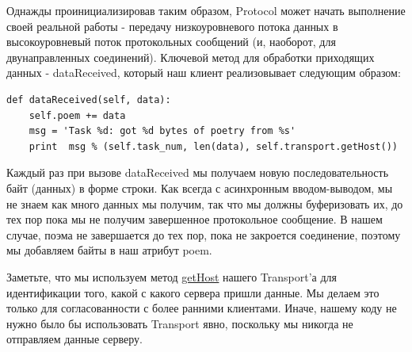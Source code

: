
Однажды проинициализировав таким образом, Protocol 
может начать выполнение своей реальной работы - 
передачу низкоуровневого потока данных в высокоуровневый 
поток протокольных сообщений (и, наоборот, для двунаправленных соединений). 
Ключевой метод для обработки приходящих данных - dataReceived, 
который наш клиент реализовывает следующим образом:

\begin{scriptsize}\begin{verbatim}
def dataReceived(self, data):
    self.poem += data
    msg = 'Task %d: got %d bytes of poetry from %s'
    print  msg % (self.task_num, len(data), self.transport.getHost())
\end{verbatim}\end{scriptsize}


Каждый раз при вызове dataReceived мы получаем новую 
последовательность байт (данных) в форме строки. 
Как всегда с асинхронным вводом-выводом, мы не знаем как много данных 
мы получим, так что мы должны буферизовать их, до тех пор пока мы 
не получим завершенное протокольное сообщение. В нашем случае, поэма не 
завершается до тех пор, пока не закроется соединение, поэтому мы 
добавляем байты в наш атрибут poem.



Заметьте, что мы используем метод 
\href{http://twistedmatrix.com/trac/browser/tags/releases/twisted-8.2.0/twisted/internet/interfaces.py#L1341}{getHost} 
нашего Transport'а для идентификации того, какой с какого сервера пришли данные. 
Мы делаем это только для согласованности с более ранними клиентами. 
Иначе, нашему коду не нужно было бы использовать Transport явно, поскольку 
мы никогда не отправляем данные серверу. 


